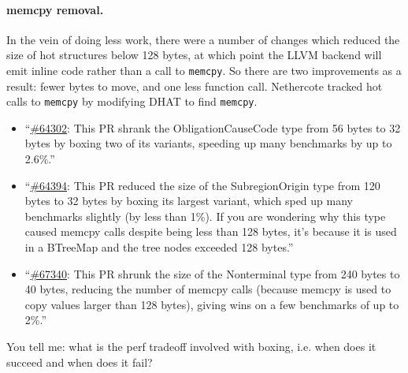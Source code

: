 \paragraph{memcpy removal.} In the vein of doing less work, there were a number of changes
which reduced the size of hot structures below 128 bytes, at which point the LLVM backend will
emit inline code rather than a call to \texttt{memcpy}. So there are two improvements as a result:
fewer bytes to move, and one less function call.
Nethercote tracked hot calls to \texttt{memcpy}
by modifying DHAT to find \texttt{memcpy}.

\begin{itemize}[noitemsep]
\item ``\href{https://github.com/rust-lang/rust/pull/64302}{\#64302}: This PR shrank the ObligationCauseCode type from 56 bytes to 32 bytes by boxing two of its variants, speeding up many benchmarks by up to 2.6\%.''
\item ``\href{https://github.com/rust-lang/rust/pull/64394}{\#64394}: This PR reduced the size of the SubregionOrigin type from 120 bytes to 32 bytes by boxing its largest variant, which sped up many benchmarks slightly (by less than 1\%). If you are wondering why this type caused memcpy calls despite being less than 128 bytes, it’s because it is used in a BTreeMap and the tree nodes exceeded 128 bytes.''
\item ``\href{https://github.com/rust-lang/rust/pull/67340}{\#67340}: This PR shrunk the size of the Nonterminal type from 240 bytes to 40 bytes, reducing the number of memcpy calls (because memcpy is used to copy values larger than 128 bytes), giving wins on a few benchmarks of up to 2\%.''
\end{itemize}
You tell me: what is the perf tradeoff involved with boxing, i.e. when does it succeed and when does it fail?

